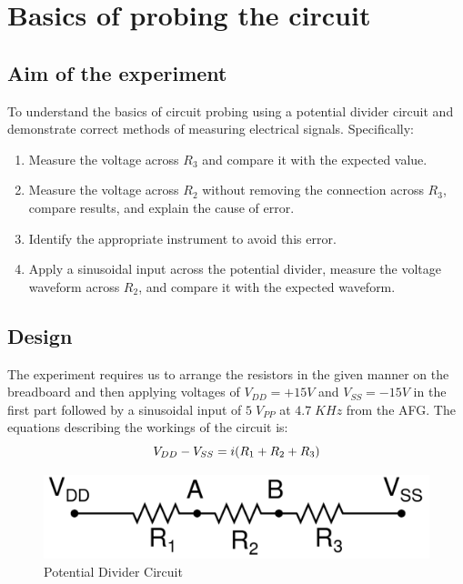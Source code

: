 \documentclass[12pt]{article}
\begin{document}
\newpage
\section{Basics of probing the circuit}
\subsection{Aim of the experiment}
To understand the basics of circuit probing using a potential divider circuit and demonstrate correct methods of measuring electrical signals. Specifically:

\begin{enumerate} 
\item Measure the voltage across \( R_{3}\) and compare it with the expected value.
\item Measure the voltage across \( R_{2}\) without removing the connection across \( R_{3}\), compare results, and explain the cause of error.
\item Identify the appropriate instrument to avoid this error.
\item Apply a sinusoidal input across the potential divider, measure the voltage waveform across \( R_{2}\), and compare it with the expected waveform.
\end{enumerate}

\subsection{Design}
The experiment requires us to arrange the resistors in the given manner on the breadboard and then applying voltages of \( V_{DD} = + 15 V \) and \( V_{SS} = - 15 V \) in the first part followed by a sinusoidal input of \( 5\;V_{PP} \) at \( 4.7\;KHz \) from the AFG. The equations describing the workings of the circuit is:  
\begin{equation}
     V_{DD} - V_{SS}
        \\
     = i(R_{1} + R_{2} + R_{3}) 
\end{equation} 

\begin{figure}[h!]
\centering
\includegraphics[scale = 0.2]{3.png}
\caption{Potential Divider Circuit}
\end{figure}
\end{document}
